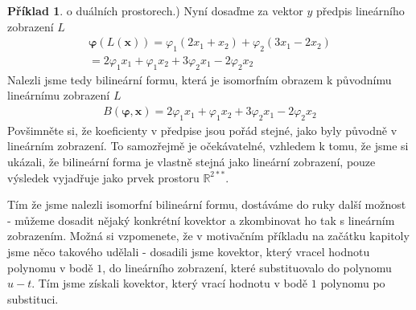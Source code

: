 \documentclass[a5paper,12pt]{amsbook}
\theoremstyle{definition}
\newtheorem{example}{Příklad}[chapter]
\newcommand{\myvec}[1]{\bm{#1}}
\newcommand{\myspace}[1]{\mathbb{#1}}
\begin{document}
\begin{example}
o duálních prostorech.) Nyní dosaďme za vektor $y$ předpis lineárního zobrazení $L$
\begin{equation*}
\begin{split}
\myvec{\varphi}(L(\myvec{x})) = \varphi_1(2x_1 + x_2) + \varphi_2(3x_1 - 2x_2) \\
  = 2\varphi_1 x_1 + \varphi_1 x_2 + 3\varphi_2 x_1 - 2\varphi_2 x_2
\end{split}
\end{equation*}
Nalezli jsme tedy bilineární formu, která je isomorfním obrazem k původnímu lineárnímu zobrazení $L$
\begin{equation*}
\begin{split}
B(\myvec{\varphi}, \myvec{x}) = 2\varphi_1 x_1 + \varphi_1 x_2 + 3\varphi_2 x_1 - 2\varphi_2 x_2
\end{split}
\end{equation*}
Povšimněte si, že koeficienty v předpise jsou pořád stejné, jako byly původně v lineárním zobrazení.
To samozřejmě je očekávatelné, vzhledem k tomu, že jsme si ukázali, že bilineární forma je vlastně
stejná jako lineární zobrazení, pouze výsledek vyjadřuje jako prvek prostoru $\myspace{R}^{2**}$.

Tím že jsme nalezli isomorfní bilineární formu, dostáváme do ruky další možnost - můžeme dosadit
nějaký konkrétní kovektor a zkombinovat ho tak s lineárním zobrazením. Možná si vzpomenete, že
v motivačním příkladu na začátku kapitoly jsme něco takového udělali - dosadili jsme kovektor,
který vracel hodnotu polynomu v bodě $1$, do lineárního zobrazení, které substituovalo do
polynomu $u - t$. Tím jsme získali kovektor, který vrací hodnotu v bodě $1$ polynomu po substituci.


\end{example}
\end{document}
